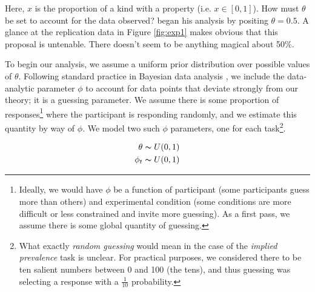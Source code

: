 \documentclass[10pt,letterpaper]{article}
\begin{document}


Here, $x$ is the proportion of a kind with a property (i.e. $x \in [0,1]$). How must $\theta$ be set to account for the data observed?  began his analysis by positing $\theta = 0.5$. A glance at the replication data in Figure \ref{fig:exp1} makes obvious that this proposal is untenable. There doesn't seem to be anything magical about 50\%. 

To begin our analysis, we assume a uniform prior distribution over possible values of $\theta$. Following standard practice in Bayesian data analysis \cite{LW2014}, we include the data-analytic parameter $\phi$ to account for data points that deviate strongly from our theory; it is a guessing parameter. We assume there is some proportion of responses\footnote{Ideally, we would have $\phi$ be a function of participant (some participants guess more than others) and experimental condition (some conditions are more difficult or less constrained and invite more guessing). As a first pass, we assume there is some global quantity of guessing.} where the participant is responding randomly, and we estimate this quantity by way of $\phi$. We model two such $\phi$ parameters, one for each task\footnote{What exactly \emph{random guessing} would mean in the case of the \emph{implied prevalence} task is unclear. For practical purposes, we considered there to be ten salient numbers between 0 and 100 (the tens), and thus guessing was selecting a response with a $\frac{1}{10}$ probability.}.

\begin{align*}
\theta \thicksim U(0,1) \\
\phi_{t} \thicksim U(0,1) %
\end{align*}

%
\end{document}
